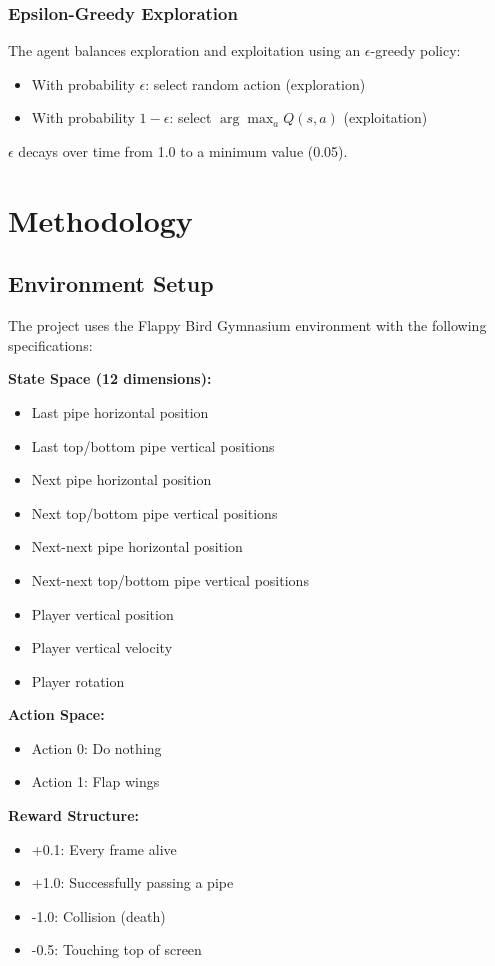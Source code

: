\documentclass[12pt,a4paper]{article}
\begin{document}
\subsubsection{Epsilon-Greedy Exploration}
The agent balances exploration and exploitation using an $\epsilon$-greedy policy:
\begin{itemize}
    \item With probability $\epsilon$: select random action (exploration)
    \item With probability $1-\epsilon$: select $\arg\max_a Q(s, a)$ (exploitation)
\end{itemize}
$\epsilon$ decays over time from 1.0 to a minimum value (0.05).

\section{Methodology}

\subsection{Environment Setup}
The project uses the Flappy Bird Gymnasium environment with the following specifications:

\textbf{State Space (12 dimensions):}
\begin{itemize}
    \item Last pipe horizontal position
    \item Last top/bottom pipe vertical positions
    \item Next pipe horizontal position
    \item Next top/bottom pipe vertical positions
    \item Next-next pipe horizontal position
    \item Next-next top/bottom pipe vertical positions
    \item Player vertical position
    \item Player vertical velocity
    \item Player rotation
\end{itemize}

\textbf{Action Space:}
\begin{itemize}
    \item Action 0: Do nothing
    \item Action 1: Flap wings
\end{itemize}

\textbf{Reward Structure:}
\begin{itemize}
    \item +0.1: Every frame alive
    \item +1.0: Successfully passing a pipe
    \item -1.0: Collision (death)
    \item -0.5: Touching top of screen
\end{itemize}
\end{document}
